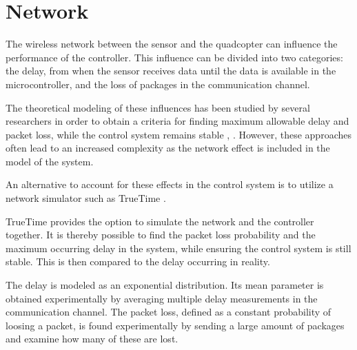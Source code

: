 \section{Network}
The wireless network between the sensor and the quadcopter can influence the performance of the controller. This influence can be divided into two categories: the delay, from when the sensor receives data until the data is available in the microcontroller, and the loss of packages in the communication channel.


The theoretical modeling of these influences has been studied by several researchers in order to obtain a criteria for finding maximum allowable delay and packet loss, while the control system remains stable  \cite{ling}, \cite{nirupam}. However, these approaches often lead to an increased complexity as the network effect is included in the model of the system.

An alternative to account for these effects in the control system is to utilize a network simulator such as TrueTime \cite{TrueTimeNew}.

TrueTime provides the option to simulate the network and the controller together. It is thereby possible to find the packet loss probability and the maximum occurring delay in the system, while ensuring the control system is still stable. This is then compared to the delay occurring in reality.

The delay is modeled as an exponential distribution. Its mean parameter is obtained experimentally by averaging multiple delay measurements in the communication channel. The packet loss, defined as a constant probability of loosing a packet, is found experimentally by sending a large amount of packages and examine how many of these are lost.
%
